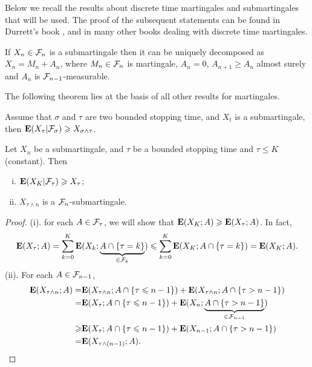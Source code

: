  Below we recall the results about discrete time martingales and submartingales that will be used. The proof of the subsequent statements can be found in Durrett’s book \cite{durrett2019probability}, and in many other books dealing with discrete time martingales.
	\begin{theorem}[Doob]\label{thm:Doob-D}
 If $X_n\in {\mathcal F}_n$  is a submartingale then it can be uniquely decomposed as $X_n=M_n+A_n$, where $M_n\in {\mathcal F}_n$ is martingale, $A_n=0$, $A_{n+1}\geq A_n$ almost surely and $A_n$ is ${\mathcal F}_{n-1}$-measurable.
	\end{theorem}
	The following theorem lies at the basis of all other results for
	martingales.
	\begin{theorem}\label{thm:Doob}
		Assume that $\sigma$ and $\tau$ are two bounded stopping time, and $X_t$ is a submartingale, then ${\mathbf E} (X_{\tau}|{\mathcal F}_{\sigma}) \geqslant  X_{\sigma\wedge \tau}$.  
	\end{theorem}
	
	\begin{lemma}
		Let  $X_n$ be a submartingale, and $\tau$ be a bounded stopping time and $\tau\leq K$ (constant). Then 
		\begin{enumerate}[(i)]
			\item ${\mathbf E}(X_{K}|{\mathcal F}_\tau)\geqslant X_\tau$; 
			\item $X_{\tau\wedge n}$ is a ${\mathcal F}_n$-submartingale. 
		\end{enumerate}
	\end{lemma}
	\begin{proof}
		(i). for each $A\in {\mathcal F}_\tau$, we will show that ${\mathbf E}(X_K; A)\geqslant {\mathbf E} (X_\tau; A)$. In fact, 
		\begin{align*}
			{\mathbf E} (X_\tau; A)=\sum_{k=0}^K {\mathbf E} (X_{k}; \underbrace{A\cap \{\tau=k\}}_{\in {\mathcal F}_k})\leqslant \sum_{k=0}^K {\mathbf E} (X_{K}; A\cap \{\tau=k\}) = {\mathbf E} (X_K; A). 
		\end{align*}
		(ii). For each $A\in {\mathcal F}_{n-1}$, 
		\begin{align*}
			{\mathbf E}(X_{\tau\wedge n}; A)=&{\mathbf E}(X_{\tau\wedge n}; A\cap\{\tau\leqslant n-1\})+{\mathbf E}(X_{\tau\wedge n}; A\cap\{\tau> n-1\})\\
			=&{\mathbf E}(X_{\tau}; A\cap\{\tau \leqslant n-1\})+{\mathbf E}(X_{n}; \underbrace{A\cap\{\tau> n-1\}}_{\in {\mathcal F}_{n-1}})\\
			\geqslant& {\mathbf E}(X_{\tau}; A\cap\{\tau\leqslant n-1\})+{\mathbf E}(X_{n-1}; A\cap\{\tau> n-1\})\\
			=& {\mathbf E}(X_{\tau\wedge (n-1)}; A).
		\end{align*}
	\end{proof}
	

